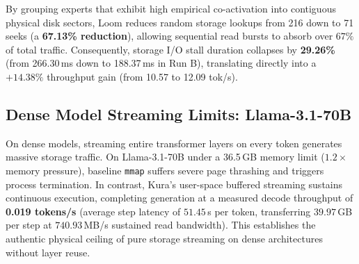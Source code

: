 \begin{table}[h]
\caption{Performance on the OLMoE-1B-7B 8-layer proxy (1.21\,GB, Q8\_0) under a 256\,MB cgroup limit. Loom spectral coalescing collapses random storage seeks and reduces I/O stalls, improving sustained token throughput.}
\label{tab:olmoe_real}
\centering
{}
\end{table}

By grouping experts that exhibit high empirical co-activation into contiguous physical disk sectors, Loom reduces random storage lookups from 216 down to 71 seeks (a \textbf{67.13\% reduction}), allowing sequential read bursts to absorb over $67\%$ of total traffic. Consequently, storage I/O stall duration collapses by \textbf{29.26\%} (from 266.30\,ms down to 188.37\,ms in Run B), translating directly into a $+14.38\%$ throughput gain (from 10.57 to 12.09 tok/s).

\subsection{Dense Model Streaming Limits: Llama-3.1-70B}
On dense models, streaming entire transformer layers on every token generates massive storage traffic. On Llama-3.1-70B under a 36.5\,GB memory limit ($1.2\times$ memory pressure), baseline \texttt{mmap} suffers severe page thrashing and triggers process termination. In contrast, Kura's user-space buffered streaming sustains continuous execution, completing generation at a measured decode throughput of \textbf{0.019 tokens/s} (average step latency of $51.45$\,s per token, transferring $39.97$\,GB per step at $740.93$\,MB/s sustained read bandwidth). This establishes the authentic physical ceiling of pure storage streaming on dense architectures without layer reuse.

